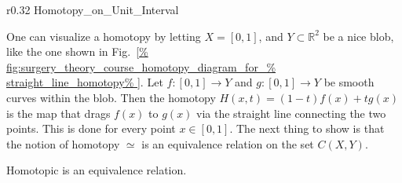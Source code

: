 \documentclass[crop=false,class=article,oneside]{standalone}
\begin{document}
        \begin{wrapfigure}[8]{r}{0.32\textwidth}
            \centering
            \captionsetup{type=figure}
            \vspace{-1ex}
            {Homotopy_on_Unit_Interval}
            \caption[Another Homotopy Diagram]{%
                Straight-line homotopy%
            }
            \label{%
                fig:surgery_theory_course_homotopy_diagram_%
                for_straight_line_homotopy%
            }
        \end{wrapfigure}
        One can visualize a homotopy by letting $X=[0,1]$,
        and $Y\subset\mathbb{R}^{2}$ be a nice blob,
        like the one shown in
        Fig.~\ref{%
            fig:surgery_theory_course_homotopy_diagram_for_%
            straight_line_homotopy%
        }.
        Let $f:[0,1]\rightarrow Y$ and $g:[0,1]\rightarrow Y$
        be smooth curves within the blob. Then the homotopy
        $H(x,t)=(1-t)f(x)+tg(x)$ is the map that drags $f(x)$
        to $g(x)$ via the straight line connecting the two
        points. This is done for every point $x\in [0,1]$.
        The next thing to show is that the notion of
        homotopy $\simeq$ is an equivalence relation on the
        set $C(X,Y)$.
        \begin{theorem}
            Homotopic is an equivalence relation.
        \end{theorem}
\end{document}

